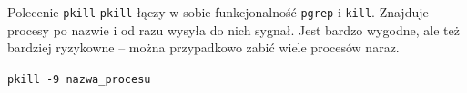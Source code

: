 
\begin{importantbox}{Polecenie \texttt{pkill}}
\texttt{pkill} łączy w sobie funkcjonalność \texttt{pgrep} i \texttt{kill}. Znajduje procesy po nazwie i od razu wysyła do nich sygnał. Jest bardzo wygodne, ale też bardziej ryzykowne -- można przypadkowo zabić wiele procesów naraz.
\begin{center}
\texttt{pkill -9 nazwa\_procesu}
\end{center}
\end{importantbox}
